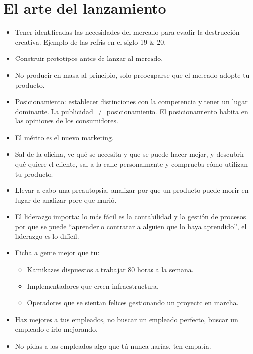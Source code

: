 \documentclass{article}
\begin{document}
\section{El arte del lanzamiento}
\begin{itemize}
    \item Tener identificadas las necesidades del mercado para evadir la destrucción creativa. Ejemplo de las refris en el siglo 19 \& 20.
    \item Construir prototipos antes de lanzar al mercado.
    \item No producir en masa al principio, solo preocuparse que el mercado adopte tu producto.
    \item Posicionamiento: establecer distinciones con la competencia y tener un lugar dominante. La publicidad $\neq $ posicionamiento. El posicionamiento habita en las opiniones de los consumidores.
    \item El mérito es el nuevo marketing.
    \item Sal de la oficina, ve qué se necesita y que se puede hacer mejor, y descubrir qué quiere el cliente, sal a la calle personalmente y comprueba cómo utilizan tu producto.
    \item Llevar a cabo una preautopsia, analizar por que un producto puede morir en lugar de analizar pore que murió.
    \item El liderazgo importa: lo más fácil es la contabilidad y la gestión de procesos por que se puede ``aprender o contratar a alguien que lo haya aprendido'', el liderazgo es lo difícil.
    \item Ficha a gente mejor que tu: 
        \begin{itemize}
            \item Kamikazes dispuestos a trabajar 80 horas a la semana.
            \item Implementadores que creen infraestructura.
            \item Operadores que se sientan felices gestionando un proyecto en marcha.
        \end{itemize}
    
    \item Haz mejores a tus empleados, no buscar un empleado perfecto, buscar un empleado e irlo mejorando.
    \item No pidas a los empleados algo que tú nunca harías, ten empatía.
\end{itemize}
\end{document}
